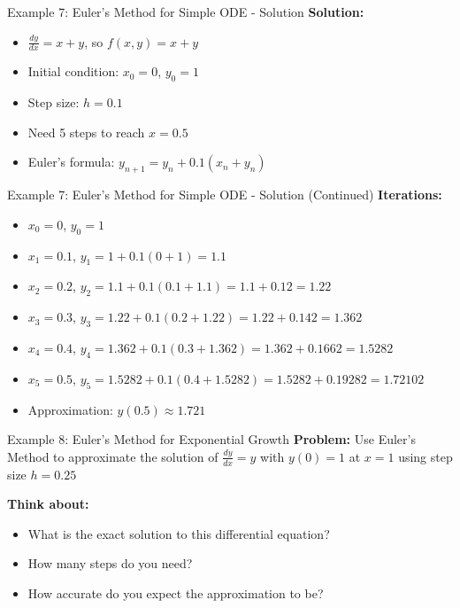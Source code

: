 \documentclass[aspectratio=169]{beamer}
\begin{document}
\begin{frame}{Example 7: Euler's Method for Simple ODE - Solution}
\textbf{Solution:}
\begin{itemize}
    \item $\frac{dy}{dx} = x + y$, so $f(x,y) = x + y$
    \item Initial condition: $x_0 = 0$, $y_0 = 1$
    \item Step size: $h = 0.1$
    \item Need 5 steps to reach $x = 0.5$
    \item Euler's formula: $y_{n+1} = y_n + 0.1(x_n + y_n)$
\end{itemize}
\end{frame}

\begin{frame}{Example 7: Euler's Method for Simple ODE - Solution (Continued)}
\textbf{Iterations:}
\begin{itemize}
    \item $x_0 = 0$, $y_0 = 1$
    \item $x_1 = 0.1$, $y_1 = 1 + 0.1(0 + 1) = 1.1$
    \item $x_2 = 0.2$, $y_2 = 1.1 + 0.1(0.1 + 1.1) = 1.1 + 0.12 = 1.22$
    \item $x_3 = 0.3$, $y_3 = 1.22 + 0.1(0.2 + 1.22) = 1.22 + 0.142 = 1.362$
    \item $x_4 = 0.4$, $y_4 = 1.362 + 0.1(0.3 + 1.362) = 1.362 + 0.1662 = 1.5282$
    \item $x_5 = 0.5$, $y_5 = 1.5282 + 0.1(0.4 + 1.5282) = 1.5282 + 0.19282 = 1.72102$
    \item Approximation: $y(0.5) \approx 1.721$
\end{itemize}
\end{frame}

\begin{frame}{Example 8: Euler's Method for Exponential Growth}
\textbf{Problem:} Use Euler's Method to approximate the solution of $\frac{dy}{dx} = y$ with $y(0) = 1$ at $x = 1$ using step size $h = 0.25$

\textbf{Think about:}
\begin{itemize}
    \item What is the exact solution to this differential equation?
    \item How many steps do you need?
    \item How accurate do you expect the approximation to be?
\end{itemize}
\end{frame}
\end{document}
